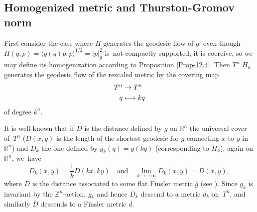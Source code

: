 \documentclass[JEP,XML,SOM,NoFloatCountersInSection,Unicode,published]{cedram}
\newcommand\mto{\mathchoice{\longmapsto}{\mapsto}{\mapsto}{\mapsto}}
\newcommand{\quand}{\quad\text{and}\quad}
\numberwithin{equation}{section}
\theoremstyle{plain}
\theoremstyle{definition}
\theoremstyle{remark}
\begin{document}
\subsection{Homogenized metric and Thurston-Gromov norm}
First consider the case where $H$ generates the geodesic flow of $g$:
even though \hbox{$H(q,p) = \langle g(q) p, p \rangle ^{1/2}=\vert p\vert ^{2}_{g}$} is~not compactly supported,
it is coercive, so we may define its homogenization according to Proposition \ref{Prop-12.4}. Then $T^n$
$H_{k}$ generates the geodesic flow of the rescaled metric by the
covering map
\begin{align*}
T^{n} & \to T^{n}\\
q & \mto kq
\end{align*}
of degree $k^{n}$.

It is well-known that if $D$ is the distance defined by $g$ on $ {\mathbb R}^n$ the universal cover of~$T^n$
(\ie $D(x,y)$ is the length of the shortest geodesic for $g$
connecting $x$ to $y$ in~$ {\mathbb R}^n$) and $D_{k}$ the one defined by $g_{k}(q)=g(kq)$
(corresponding to $H_{k}$), again on $ {\mathbb R}^n$,
we~have
\[
D_{k} (x,y) = \frac{1}{k} D (kx, ky)
\quand
\lim_{k\to +\infty} D_{k} (x,y) = {\overline D} (x,y),
\]
where $\overline D$ is the distance associated to some flat Finsler metric
$\overline g$ (see \cite[Th.\,III.1]{Acerbi-Buttazzo}).
Since $g_k$ is invariant by the $ \mathbb Z^n$-action, $g_k$ and hence $D_k$ descend to a metric $d_k$ on~$T^n$, and
similarly $\overline D$ descends to a Finsler metric $\overline d$.
\end{document}
